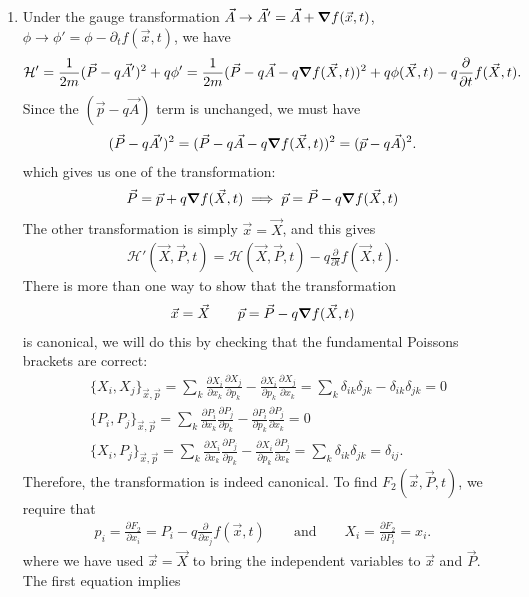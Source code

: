 \documentclass{article}
\theoremstyle{definition}
\newcommand{\p}{\partial}
\newcommand{\ham}{\mathcal{H}}
\newcommand{\f}[2]{\frac{#1}{#2}}
\begin{document}
\begin{enumerate}[label=(\alph*)]
	
	\item Under the gauge transformation $\vec{A}\to \vec{A}' = \vec{A} + \grad f (\vec{x},t)$, $\phi \to \phi' = \phi - \p_t f(\vec{x},t)$, we have
	\begin{align*}
	\ham' = \f{1}{2m} (\vec{P} - q\vec{A}')^2 + q\phi' = \f{1}{2m} (\vec{P} - q\vec{A} - q\grad f(\vec{X},t))^2 + q\phi(\vec{X},t) - q\f{\p}{\p t} f(\vec{X},t).
	\end{align*}
	Since the $(\vec{p} - q\vec{A})$ term is unchanged, we must have
	\begin{align*}
	 (\vec{P} - q\vec{A}')^2 = (\vec{P} - q\vec{A} - q\grad f(\vec{X},t))^2 = (\vec{p}-q\vec{A})^2.
	\end{align*}
	which gives us one of the transformation: 
	\begin{align*}
	\vec{P} = \vec{p} + q\grad f(\vec{X},t) \implies {\vec{p} = \vec{P} - q\grad f(\vec{X},t)}
	\end{align*}
	The other transformation is simply $\vec{x} = \vec{X}$, and this gives
	\begin{align*}
	\ham'(\vec{X},\vec{P},t) = \ham(\vec{X}, \vec{P},t) -q\f{\p }{\p t} f(\vec{X},t). 
	\end{align*}  
	There is more than one way to show that the transformation 
	\begin{align*}
	\vec{x} = \vec{X} \quad\quad \vec{p} = \vec{P} - q\grad f(\vec{X},t)
	\end{align*}
	is canonical, we will do this by checking that the fundamental Poissons brackets are correct:
	\begin{align*}
	&\{ X_i, X_j \}_{\vec{x},\vec{p}} = \sum_k \f{\p X_i}{\p x_k} \f{\p X_j}{\p p_k} - \f{\p X_i}{\p p_k} \f{\p X_j}{\p x_k} = \sum_k \delta_{ik}\delta_{jk} - \delta_{ik}\delta_{jk} = 0\\
	&\{ P_i, P_j \}_{\vec{x},\vec{p}} = \sum_k \f{\p P_i}{\p x_k} \f{\p P_j}{\p p_k} - \f{\p P_i}{\p p_k} \f{\p P_j}{\p x_k} = 0\\
	&\{ X_i, P_j \}_{\vec{x},\vec{p}} = \sum_k \f{\p X_i}{\p x_k} \f{\p P_j}{\p p_k} - \f{\p X_i}{\p p_k} \f{\p P_j}{\p x_k} = \sum_k \delta_{ik}\delta_{jk}  =  \delta_{ij}.
	\end{align*}
	Therefore, the transformation is indeed canonical. To find $F_2(\vec{x}, \vec{P},t)$, we require that 
	\begin{align*}
	p_i = \f{\p F_2}{\p x_i} = P_i - q\f{\p}{\p x_j} f(\vec{x},t) \quad\quad \text{and}\quad\quad  X_i = \f{\p F_2}{\p P_i} = x_i.
	\end{align*}
	where we have used $\vec{x} = \vec{X}$ to bring the independent variables to $\vec{x}$ and $\vec{P}$. The first equation implies  

\end{enumerate}
\end{document}
